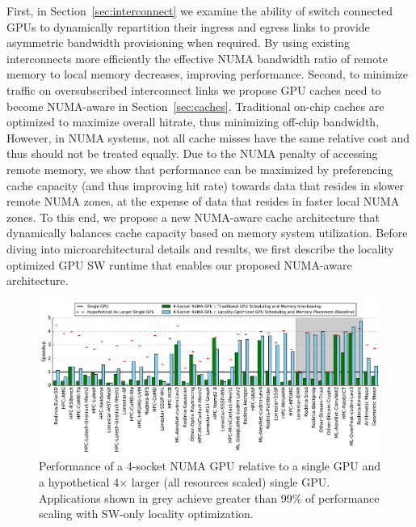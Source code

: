 First, in Section~\ref{sec:interconnect} we examine the 
ability of switch connected GPUs to dynamically repartition their ingress and 
egress links to provide asymmetric bandwidth provisioning when required.  By 
using existing interconnects more efficiently the effective NUMA bandwidth ratio 
of remote memory to local memory decreases, improving performance. Second, 
to minimize traffic on oversubscribed interconnect links we propose GPU caches need 
to become NUMA-aware in Section~\ref{sec:caches}. Traditional on-chip caches are 
optimized to maximize 
overall hitrate, thus minimizing off-chip bandwidth, However, in NUMA 
systems, not all cache misses have the same relative cost and thus should not 
be treated equally. Due to the NUMA penalty of accessing remote memory, we show 
that performance can be maximized by preferencing cache capacity (and thus 
improving hit rate) towards data that resides in slower remote NUMA zones, at the 
expense of data that resides in faster local NUMA zones. To this end, we propose 
a new NUMA-aware cache architecture that dynamically balances cache capacity based on 
memory system utilization. Before diving into microarchitectural details and results,
we first describe the locality optimized GPU SW runtime that enables our proposed
NUMA-aware architecture.

\begin{figure}[tp] 
    \centering
    \includegraphics[width=1.0\linewidth]{figures/plot_different_baselines.pdf}
    \caption{Performance of a 4-socket NUMA GPU relative to a single GPU 
and a hypothetical 4$\times$ larger (all resources scaled) single GPU.
Applications shown in grey 
achieve greater than 99\% of performance scaling with SW-only locality optimization.}
    \label{fig:motivation}
    \vspace{-.2in}
\end{figure}
